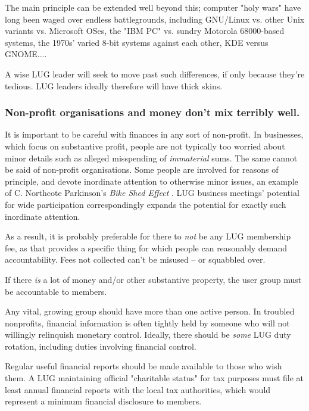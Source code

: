 \documentclass{HOWTO}
\begin{document}
 
The main principle can be extended well beyond this; computer "holy
wars" have long been waged over endless battlegrounds, including 
GNU/Linux vs. other Unix variants vs. Microsoft OSes, the "IBM PC" vs.
sundry Motorola 68000-based systems, the 1970s' varied 8-bit systems 
against each other, KDE versus GNOME....



A wise LUG leader will seek to move past such differences, if only
because they're tedious.  LUG leaders ideally therefore will have thick
skins.




\subsubsection{Non-profit organisations and money don't mix terribly well.}

It is important to be careful with finances in any sort of non-profit.
In businesses, which focus on substantive profit, people are not
typically too worried about minor details such as alleged misspending of
{\itshape immaterial\/} sums.  The same cannot be said of non-profit
organisations.  Some people are involved for reasons of principle, and
devote inordinate attention to otherwise minor issues, an example of C.
Northcote Parkinson's 
\emph{Bike Shed Effect} \texttt{\aeturl}
.  LUG business
meetings' potential for wide participation correspondingly expands the
potential for exactly such inordinate attention.



As a result, it is probably preferable for there to {\itshape not\/} be any
LUG membership fee, as that provides a specific thing for which people
can reasonably demand accountability.  Fees not collected can't be
misused -- or squabbled over.



If there {\itshape is\/} a lot of money and/or other substantive property,
the user group must be accountable to members.



Any vital, growing group should have more than one active person.  In
troubled nonprofits, financial information is often tightly held by
someone who will not willingly relinquish monetary control. Ideally,
there should be {\itshape some\/} LUG duty rotation, including duties
involving financial control.



Regular useful financial reports should be made available to those
who wish them. A LUG maintaining official "charitable status"
for tax purposes must file at least annual financial reports
with the local tax authorities, which would represent a minimum
financial disclosure to members.
\end{document}

